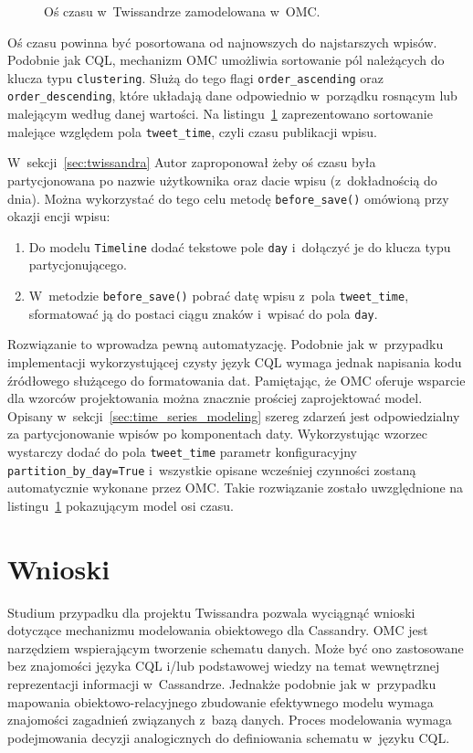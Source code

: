 \begin{figure}[ht!]
	\centering
	\theverbbox
	\caption{Oś czasu w~Twissandrze zamodelowana w~OMC.}
	\label{vrb:omc_twissandra_timeline}
\end{figure}

Oś czasu powinna być posortowana od najnowszych do najstarszych wpisów. Podobnie jak CQL, mechanizm OMC umożliwia sortowanie pól należących do klucza typu \verb+clustering+. Służą do tego flagi \verb+order_ascending+ oraz \verb+order_descending+, które układają dane odpowiednio w~porządku rosnącym lub malejącym według danej wartości. Na listingu~\ref{vrb:omc_twissandra_timeline} zaprezentowano sortowanie malejące względem pola \verb+tweet_time+, czyli czasu publikacji wpisu.

W~sekcji~\ref{sec:twissandra} Autor zaproponował żeby oś czasu była partycjonowana po nazwie użytkownika oraz dacie wpisu (z~dokładnością do dnia). Można wykorzystać do tego celu metodę \verb+before_save()+ omówioną przy okazji encji wpisu:

\begin{enumerate}
	\item Do modelu \verb+Timeline+ dodać tekstowe pole \verb+day+ i~dołączyć je do klucza typu partycjonującego.
	\item W~metodzie \verb+before_save()+ pobrać datę wpisu z~pola \verb+tweet_time+, sformatować ją do postaci ciągu znaków i~wpisać do pola \verb+day+.
\end{enumerate}

Rozwiązanie to wprowadza pewną automatyzację. Podobnie jak w~przypadku implementacji wykorzystującej czysty język CQL wymaga jednak napisania kodu źródłowego służącego do formatowania dat. Pamiętając, że OMC oferuje wsparcie dla wzorców projektowania można znacznie prościej zaprojektować model. Opisany w~sekcji~\ref{sec:time_series_modeling} szereg zdarzeń jest odpowiedzialny za partycjonowanie wpisów po komponentach daty. Wykorzystując wzorzec wystarczy dodać do pola \verb+tweet_time+ parametr konfiguracyjny \verb+partition_by_day=True+ i~wszystkie opisane wcześniej czynności zostaną automatycznie wykonane przez OMC. Takie rozwiązanie zostało uwzględnione na listingu~\ref{vrb:omc_twissandra_timeline} pokazującym model osi czasu.

\section{Wnioski}

Studium przypadku dla projektu Twissandra pozwala wyciągnąć wnioski dotyczące mechanizmu modelowania obiektowego dla Cassandry. OMC jest narzędziem wspierającym tworzenie schematu danych. Może być ono zastosowane bez znajomości języka CQL i/lub podstawowej wiedzy na temat wewnętrznej reprezentacji informacji w~Cassandrze. Jednakże podobnie jak w~przypadku mapowania obiektowo-relacyjnego zbudowanie efektywnego modelu wymaga znajomości zagadnień związanych z~bazą danych. Proces modelowania wymaga podejmowania decyzji analogicznych do definiowania schematu w~języku CQL.

